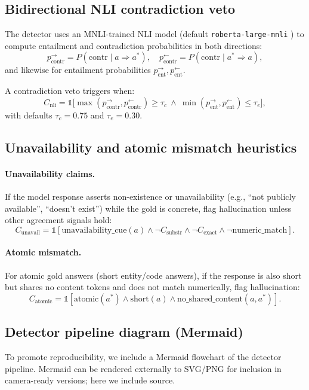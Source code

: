 \documentclass[11pt]{article}
\begin{document}
\subsection{Bidirectional NLI contradiction veto}
\label{sec:nli}
The detector uses an MNLI-trained NLI model (default \texttt{roberta-large-mnli} \cite{liu2019roberta}) to compute entailment and contradiction probabilities in both directions:
\[
p^\rightarrow_{\text{contr}} = P(\text{contr}\mid a \Rightarrow a^*),\quad
p^\leftarrow_{\text{contr}} = P(\text{contr}\mid a^* \Rightarrow a),
\]
and likewise for entailment probabilities \(p^\rightarrow_{\text{ent}},p^\leftarrow_{\text{ent}}\).

A contradiction veto triggers when:
\begin{equation}
C_{\text{nli}}=
\mathbb{1}\Big[
\max(p^\rightarrow_{\text{contr}},p^\leftarrow_{\text{contr}})\ge\tau_c \ \wedge\ 
\min(p^\rightarrow_{\text{ent}},p^\leftarrow_{\text{ent}})\le\tau_e
\Big],
\end{equation}
with defaults \(\tau_c=0.75\) and \(\tau_e=0.30\).

\subsection{Unavailability and atomic mismatch heuristics}
\paragraph{Unavailability claims.}
If the model response asserts non-existence or unavailability (e.g., ``not publicly available'', ``doesn't exist'') while the gold is concrete, flag hallucination unless other agreement signals hold:
\[
C_{\text{unavail}}=\mathbb{1}[\text{unavailability\_cue}(a)\wedge \neg C_{\text{substr}}\wedge \neg C_{\text{exact}}\wedge \neg \text{numeric\_match}].
\]

\paragraph{Atomic mismatch.}
For atomic gold answers (short entity/code answers), if the response is also short but shares no content tokens and does not match numerically, flag hallucination:
\[
C_{\text{atomic}}=\mathbb{1}[\text{atomic}(a^*)\wedge \text{short}(a)\wedge \text{no\_shared\_content}(a,a^*)].
\]

\subsection{Detector pipeline diagram (Mermaid)}
To promote reproducibility, we include a Mermaid flowchart of the detector pipeline. Mermaid can be rendered externally to SVG/PNG for inclusion in camera-ready versions; here we include source.
\end{document}
